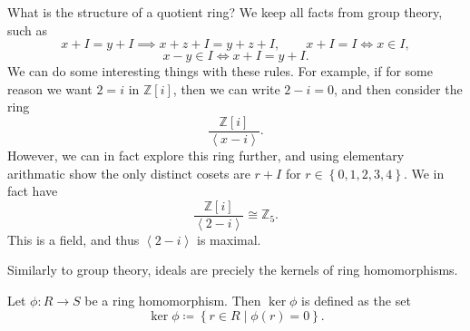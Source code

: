 
What is the structure of a quotient ring? We keep all facts from group theory, such as
\[
	x+I=y+I \implies x+z+I=y+z+I,\qquad x+I=I \iff x\in I,
\]
\[
	x-y\in I \iff x+I=y+I
.\]
We can do some interesting things with these rules. For example, if for some reason we want $2=i$ in $\mathbb{Z} [i]$, then we can write $2-i=0$, and then consider the ring
\[
	\frac{\mathbb{Z} [i]}{\left\langle x-i \right\rangle } 
.\]
However, we can in fact explore this ring further, and using elementary arithmatic show the only distinct cosets are $r+I$ for $r\in \left\{ 0,1,2,3,4 \right\} $. We in fact have
\[
	\frac{\mathbb{Z} [i]}{\left\langle 2-i \right\rangle } \cong \mathbb{Z} _5
.\]
This is a field, and thus $\left\langle 2-i \right\rangle $ is maximal.

Similarly to group theory, ideals are preciely the kernels of ring homomorphisms.
\begin{definition}[Kernel]\label{dfn:2.5}
	Let $\phi : R \to S$ be a ring homomorphism. Then $\ker \phi $ is defined as the set
	\[
		\ker \phi \coloneqq \left\{ r\in R\mid \phi (r)=0 \right\} 
	.\]
\end{definition}

